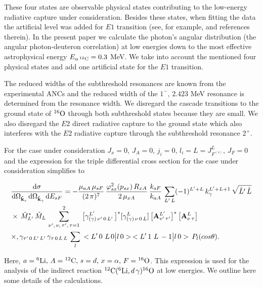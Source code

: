 \documentclass[prl,unsortedaddress,groupedaddress,twocolumn,amsmath,amsfonts,amssymb,showpacs,floatfix,nofootinbib]{revtex4}
\begin{document}
These four states are observable physical states contributing to the low-energy radiative capture under consideration. Besides these 
states, when fitting the data the artificial level was added for $E1$ transition (see, for example, 
\cite{barkerkajino,brune1999,kunz,assuncao,sayre} and references therein). In the present paper we calculate the  photon's angular distribution (the angular photon-deuteron correlation) at low energies down to the most effective astrophysical energy $E_{\alpha\,{}^{12}{\rm C}}=0.3$ MeV.
We take into account the mentioned four physical states and add one artificial state for the $E1$ transition.

The reduced widths of the subthreshold resonances are known from the experimental ANCs \cite{brune1999,avila} and the reduced width of the $1^{-},\,2.423$ MeV resonance is determined from the resonance width. 
We disregard the cascade transitions to the ground state of ${}^{16}{\rm O}$ through both subthreshold states because they are small. We also disregard the $E2$ direct radiative capture to the ground state which also interferes with the $E2$ radiative capture through the subthreshold resonance $2^{+}$. 

For the case under consideration $J_{x}=0,\,J_{A}=0,\,j_{i}=0,\,l_{i}=L=J_{F^{(s)}}^{L},\,J_{F}=0$ and the expression for the triple differential cross section for the case under consideration
simplifies to
\begin{widetext}
\begin{align}
&\frac{ {\rm d}\sigma}{  {\rm d}{\Omega}_{  {\rm{\bf {\hat k}}}_{s}}\,{\rm d}{\Omega}_{{\rm {\bf {\hat k}}}_{\gamma}}\, {\rm d}{E_{sF}} }
= - \frac{\mu_{aA}\,\mu_{sF}}{(2\,\pi)^{7} }\,\frac{\varphi_{sx}^{2}(p_{sx})\,R_{xA}}{2\,\mu_{xA}}\,\frac{ k_{sF}}{k_{aA}}\,\sum\limits_{L'\,L} (-1)^{L'+L}\, k_{\gamma}^{L'+L+1}\,
\sqrt{ {\hat L}'\,{\hat L}}                                   \nonumber\\
& \times\,  {\tilde M}_{L'}^{*}\,{\tilde M}_{L}\,\sum\limits_{\nu', \,\nu,\,\tau',\, \tau=1}^{2}\,\big[\gamma_{ (\gamma)\,\nu'\,0\,L'}^{L'}\,\big]^{*} [\gamma_{(\gamma)\,\nu\,0\,L}^{L} ]\,\big[{\bf A}_{v'\,\tau'}^{L'} \big]^{*}\,\big[{\bf A}_{\nu\,\tau}^{L} \big]\     \nonumber\\
& \times ,\gamma_{\tau'\,0\,L'\,L'} \,\gamma_{\tau\,0\,L\,L} \,\sum\limits_{l}\, <L'\,0\,\,L\,0\big|l\,0>\,<L'\,1\,\,L\,-1 \big| l\,0>\,P_{l}(cos{\theta}).
\label{tripplediffcrsect11}
\end{align}
\end{widetext}
Here, $a={}^{6}{\rm Li},\,A={}^{12}{\rm C},\,s=d,\,x=\alpha,\,F={}^{16}{\rm O}$.
This expression is used for the analysis of the indirect reaction ${}^{12}{\rm C}({}^{6}{\rm Li},d\,\gamma){}^{16}{\rm O}$ at low energies. We outline here some details of the calculations. 
\end{document}
